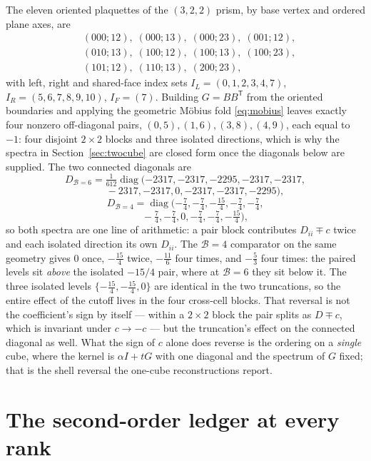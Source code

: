 \documentclass[11pt]{article}
\theoremstyle{plain}
\theoremstyle{definition}
\theoremstyle{remark}
\newcommand{\chk}[1]{}
\begin{document}
The eleven oriented plaquettes of the $(3,2,2)$ prism, by base vertex and
ordered plane axes, are
\[
\begin{aligned}
&(000;12),\;(000;13),\;(000;23),\;(001;12),\\
&(010;13),\;(100;12),\;(100;13),\;(100;23),\\
&(101;12),\;(110;13),\;(200;23),
\end{aligned}
\]
with left, right and shared-face index sets
$I_L=(0,1,2,3,4,7)$, $I_R=(5,6,7,8,9,10)$, $I_F=(7)$. Building $G=BB^{\mathsf
T}$ from the oriented boundaries and applying the geometric M\"obius fold
\eqref{eq:mobius} leaves exactly four nonzero off-diagonal pairs,
$(0,5),(1,6),(3,8),(4,9)$, each equal to $-1$: four disjoint $2\times2$ blocks
and three isolated directions, which is why the spectra in
Section~\ref{sec:twocube} are closed form once the diagonals below are
supplied. The two connected diagonals are
\[
  D_{\mathcal B=6}=\tfrac1{612}\operatorname{diag}
  (-2317,-2317,-2295,-2317,-2317,
\]
\[
  \qquad -2317,-2317,0,-2317,-2317,-2295),
\]
\[
  D_{\mathcal B=4}=\operatorname{diag}
  (-\tfrac74,-\tfrac74,-\tfrac{15}4,-\tfrac74,-\tfrac74,
\]
\[
  \qquad -\tfrac74,-\tfrac74,0,-\tfrac74,-\tfrac74,-\tfrac{15}4),
\]
so both spectra are one line of arithmetic: a pair block contributes
$D_{ii}\mp c$ twice and each isolated direction its own $D_{ii}$. The $\mathcal B=4$
comparator on the same geometry gives $0$ once, $-\tfrac{15}4$ twice,
$-\tfrac{11}6$ four times, and $-\tfrac53$ four times:
the paired levels sit \emph{above} the isolated $-15/4$ pair, where at $\mathcal B=6$
they sit below it. The three isolated levels $\{-\tfrac{15}4,-\tfrac{15}4,0\}$
are identical in the two truncations, so the entire effect of the cutoff lives
in the four cross-cell blocks. That reversal is not the coefficient's sign by itself --- within a
$2\times2$ block the pair splits as $D\mp c$, which is invariant under
$c\to-c$ --- but the truncation's effect on the connected diagonal as well.
What the sign of $c$ alone does reverse is the ordering on a \emph{single}
cube, where the kernel is $\alpha I+tG$ with one diagonal and the spectrum of
$G$ fixed; that is the shell reversal the one-cube reconstructions report.
\chk{the B=4 comparator on the same geometry gives -1/12 with the reversed spectrum}

\section{The second-order ledger at every rank}\label{app:ledger-n}
\end{document}
